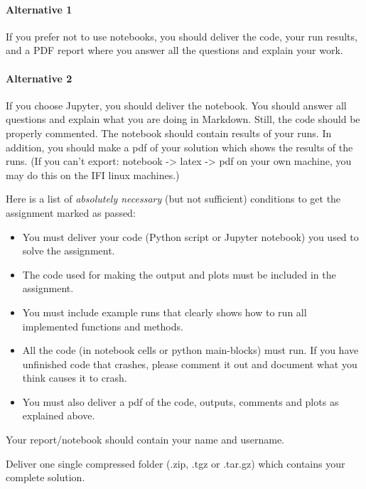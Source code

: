 \documentclass[11pt]{article}
\providecommand{\tightlist}{%
      \setlength{\itemsep}{0pt}\setlength{\parskip}{0pt}}
\begin{document}
\hypertarget{alternative-1}{%
\paragraph{Alternative 1}\label{alternative-1}}

If you prefer not to use notebooks, you should deliver the code, your
run results, and a PDF report where you answer all the questions and
explain your work.

\hypertarget{alternative-2}{%
\paragraph{Alternative 2}\label{alternative-2}}

If you choose Jupyter, you should deliver the notebook. You should
answer all questions and explain what you are doing in Markdown. Still,
the code should be properly commented. The notebook should contain
results of your runs. In addition, you should make a pdf of your
solution which shows the results of the runs. (If you can't export:
notebook -\textgreater{} latex -\textgreater{} pdf on your own machine,
you may do this on the IFI linux machines.)

Here is a list of \emph{absolutely necessary} (but not sufficient)
conditions to get the assignment marked as passed:

\begin{itemize}
\tightlist
\item
  You must deliver your code (Python script or Jupyter notebook) you
  used to solve the assignment.
\item
  The code used for making the output and plots must be included in the
  assignment.
\item
  You must include example runs that clearly shows how to run all
  implemented functions and methods.
\item
  All the code (in notebook cells or python main-blocks) must run. If
  you have unfinished code that crashes, please comment it out and
  document what you think causes it to crash.
\item
  You must also deliver a pdf of the code, outputs, comments and plots
  as explained above.
\end{itemize}

Your report/notebook should contain your name and username.

Deliver one single compressed folder (.zip, .tgz or .tar.gz) which
contains your complete solution.
\end{document}
